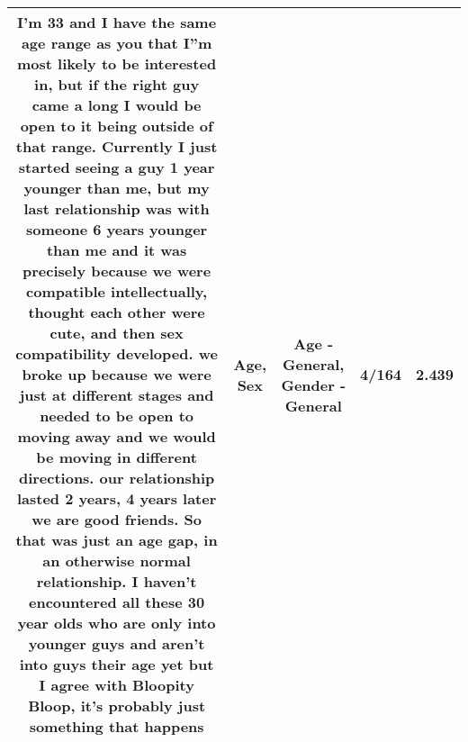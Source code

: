 \documentclass[11pt]{article}
\newlength\mylength
\begin{document}
\begin{center}
\begin{longtable}{|C{.65\mylength}|C{.30\mylength}|C{.12\mylength}|C{.12\mylength}|C{.12\mylength}|}
  \small I'm 33 and I have the same \textbf{age} range as you that I''m most likely to be interested in, but if the right guy came a long I would be open to it being outside of that range. Currently I just started seeing a guy 1 year younger than me, but my last relationship was with someone 6 years younger than me and it was precisely because we were compatible intellectually, thought each other were cute, and then \textbf{sex} compatibility developed. we broke up because we were just at different stages and needed to be open to moving away and we would be moving in different directions. our relationship lasted 2 years, 4 years later we are good friends. So that was just an \textbf{age} gap, in an otherwise normal relationship. I haven't encountered all these 30 year olds who are only into younger guys and aren't into guys their \textbf{age} yet but I agree with Bloopity Bloop, it's probably just something that happens\normalsize   & Age, Sex & Age - General, Gender - General & 4/164 & 2.439 \\  \hline
  
\end{longtable}
\end{center}
\end{document}
